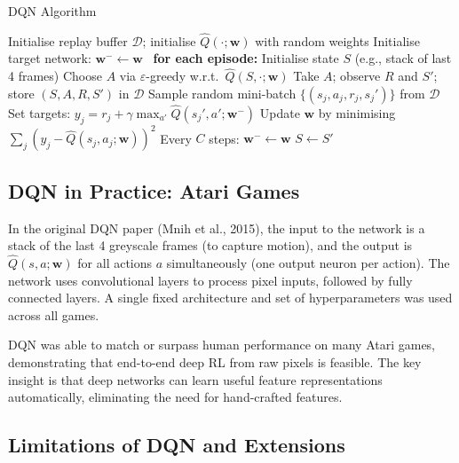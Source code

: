 \documentclass[11pt,a4paper]{article}
\begin{document}
\begin{algobox}[breakable]{DQN Algorithm}
\begin{algorithmic}[1]
\State Initialise replay buffer $\mathcal{D}$; initialise $\hat{Q}(\cdot;\mathbf{w})$ with random weights
\State Initialise target network: $\mathbf{w}^- \leftarrow \mathbf{w}$
\Loop\ \textbf{for each episode:}
  \State Initialise state $S$ (e.g., stack of last 4 frames)
  \Repeat
    \State Choose $A$ via $\varepsilon$-greedy w.r.t.\ $\hat{Q}(S,\cdot;\mathbf{w})$
    \State Take $A$; observe $R$ and $S'$; store $(S,A,R,S')$ in $\mathcal{D}$
    \State Sample random mini-batch $\{(s_j,a_j,r_j,s_j')\}$ from $\mathcal{D}$
    \State Set targets: $y_j = r_j + \gamma\max_{a'}\hat{Q}(s_j',a';\mathbf{w}^-)$
    \State Update $\mathbf{w}$ by minimising $\sum_j(y_j - \hat{Q}(s_j,a_j;\mathbf{w}))^2$
    \State Every $C$ steps: $\mathbf{w}^- \leftarrow \mathbf{w}$
    \State $S \leftarrow S'$
\EndLoop
\end{algorithmic}
\end{algobox}

\subsection{DQN in Practice: Atari Games}

In the original DQN paper (Mnih et al., 2015), the input to the network is a stack of the last 4 greyscale frames (to capture motion), and the output is $\hat{Q}(s,a;\mathbf{w})$ for all actions $a$ simultaneously (one output neuron per action). The network uses convolutional layers to process pixel inputs, followed by fully connected layers. A single fixed architecture and set of hyperparameters was used across all games.

DQN was able to match or surpass human performance on many Atari games, demonstrating that end-to-end deep RL from raw pixels is feasible. The key insight is that deep networks can learn useful feature representations automatically, eliminating the need for hand-crafted features.

\subsection{Limitations of DQN and Extensions}
\end{document}
